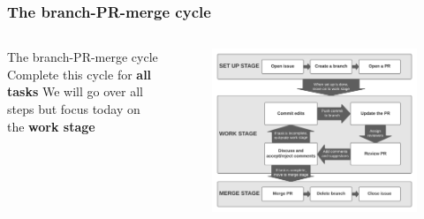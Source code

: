 \documentclass[aspectratio=169]{beamer} %
\begin{document}
\begin{frame}
\frametitle{The branch-PR-merge cycle}

	\begin{columns}[c]
	
		\large The branch-PR-merge cycle 
		\vspace{.7cm}\newline
		\large Complete this cycle for \textbf{all tasks}
		\vspace{.7cm}\newline
		\large We will go over all steps but focus today on the \textbf{work stage}	

		\vspace{-.75cm}
		\begin{figure}
			\centering
			\includegraphics[width=\textwidth]{./img/branch-pr-merge-cycle.png}
		\end{figure}
		
	\end{columns}
\end{frame}
\end{document}
